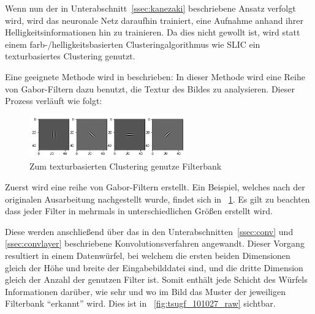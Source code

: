 Wenn nun der in Unterabschnitt~\ref{ssec:kanezaki} beschriebene Ansatz verfolgt wird, wird das neuronale Netz daraufhin trainiert, eine Aufnahme anhand ihrer Helligkeitsinformationen hin zu trainieren. Da dies nicht gewollt ist, wird statt einem farb-/helligkeitsbasierten Clusteringalgorithmus wie SLIC ein texturbasiertes Clustering genutzt.

Eine geeignete Methode wird in \cite{jain_91} beschrieben: In dieser Methode wird eine Reihe von Gabor-Filtern dazu benutzt, die Textur des Bildes zu analysieren. Dieser Prozess verläuft wie folgt:

\begin{figure}
	\centering
	\includegraphics[width=0.6\textwidth,keepaspectratio]{images/gen/GEN_tsugf_filterbank.png}
	\captionsetup{format=plain}
	\caption{Zum texturbasierten Clustering genutze Filterbank}
	\label{fig:tsugf_filters}
\end{figure}

Zuerst wird eine reihe von Gabor-Filtern erstellt. Ein Beispiel, welches nach der originalen Ausarbeitung nachgestellt wurde, findet sich in \figurename~\ref{fig:tsugf_filters}. Es gilt zu beachten dass jeder Filter in mehrmals in unterschiedlichen Größen erstellt wird.

Diese werden anschließend über das in den Unterabschnitten~\ref{ssec:conv} und \ref{ssec:convlayer} beschriebene Konvolutionsverfahren angewandt. Dieser Vorgang resultiert in einem Datenwürfel, bei welchem die ersten beiden Dimensionen gleich der Höhe und breite der Eingabebilddatei sind, und die dritte Dimension gleich der Anzahl der genutzen Filter ist. Somit enthält jede Schicht des Würfels Informationen darüber, wie sehr und wo im Bild das Muster der jeweiligen Filterbank \enquote{erkannt} wird. Dies ist in \figurename~\ref{fig:tsugf_101027_raw} sichtbar.

